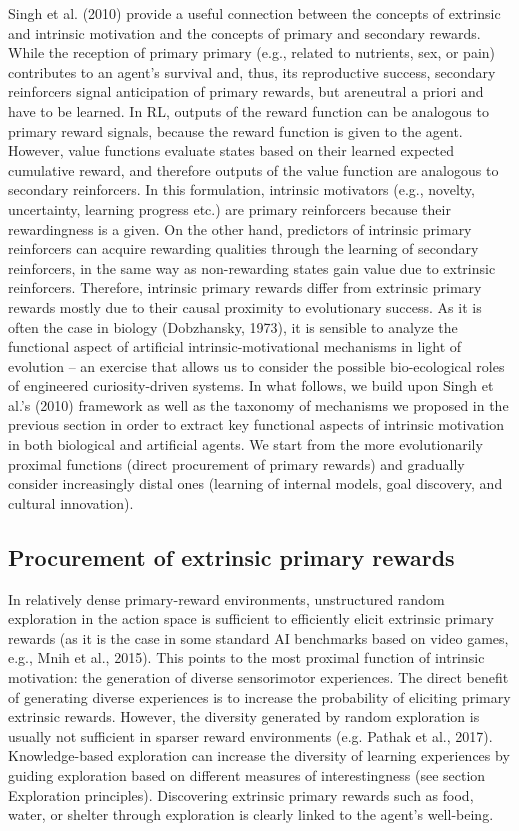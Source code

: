 Singh et al. (2010) provide a useful connection between the concepts of extrinsic and intrinsic motivation and the concepts of primary and secondary rewards. While the reception of primary primary (e.g., related to nutrients, sex, or pain) contributes to an agent’s survival and, thus, its reproductive success, secondary reinforcers signal anticipation of primary rewards, but areneutral a priori and have to be learned. In RL, outputs of the reward function can be analogous to primary reward signals, because the reward function is given to the agent. However, value functions evaluate states based on their learned expected cumulative reward, and therefore outputs of the value function are analogous to secondary reinforcers. In this formulation, intrinsic motivators (e.g., novelty, uncertainty, learning progress etc.) are primary reinforcers because their rewardingness is a given. On the other hand, predictors of intrinsic primary reinforcers can acquire rewarding qualities through the learning of secondary reinforcers, in the same way as non-rewarding states gain value due to extrinsic reinforcers. Therefore, intrinsic primary rewards differ from extrinsic primary rewards mostly due to their causal proximity to evolutionary success. As it is often the case in biology (Dobzhansky, 1973), it is sensible to analyze the functional aspect of artificial intrinsic-motivational mechanisms in light of evolution -- an exercise that allows us to consider the possible bio-ecological roles of engineered curiosity-driven systems.
In what follows, we build upon Singh et al.’s (2010) framework as well as the taxonomy of mechanisms we proposed in the previous section in order to extract key functional aspects of intrinsic motivation in both biological and artificial agents. We start from the more evolutionarily proximal functions (direct procurement of primary rewards) and gradually consider increasingly distal ones (learning of internal models, goal discovery, and cultural innovation).

\subsection{Procurement of extrinsic primary rewards}
In relatively dense primary-reward environments, unstructured random exploration in the action space is sufficient to efficiently elicit extrinsic primary rewards (as it is the case in some standard AI benchmarks based on video games, e.g., Mnih et al., 2015). This points to the most proximal function of intrinsic motivation: the generation of diverse sensorimotor experiences. The direct benefit of generating diverse experiences is to increase the probability of eliciting primary extrinsic rewards. However, the diversity generated by random exploration is usually not sufficient in sparser reward environments (e.g. Pathak et al., 2017). Knowledge-based exploration can increase the diversity of learning experiences by guiding exploration based on different measures of interestingness (see section Exploration principles). Discovering extrinsic primary rewards such as food, water, or shelter through exploration is clearly linked to the agent’s well-being.


